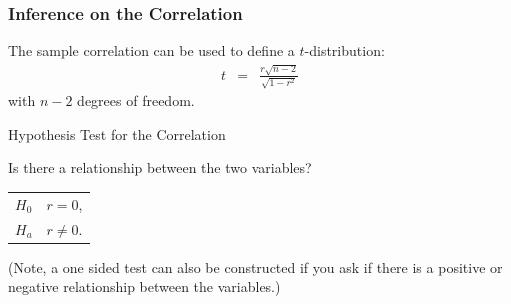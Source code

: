 \begin{frame}
  \frametitle{Inference on the Correlation}

  \begin{definition}
    The sample correlation can be used to define a $t$-distribution:
    \begin{eqnarray*}
      t & = & \frac{r\sqrt{n-2}}{\sqrt{1-r^2}}
    \end{eqnarray*}
    with $n-2$ degrees of freedom.
  \end{definition}

\end{frame}

\begin{frame}{Hypothesis Test for the Correlation}

  Is there a relationship between the two variables? \\
  \begin{tabular}{ll}
    $H_0$ & $r=0$, \\
    $H_a$ & $r\neq 0$.
  \end{tabular}

  (Note, a one sided test can also be constructed if you ask if there
  is a positive or negative relationship between the variables.)

  
\end{frame}


